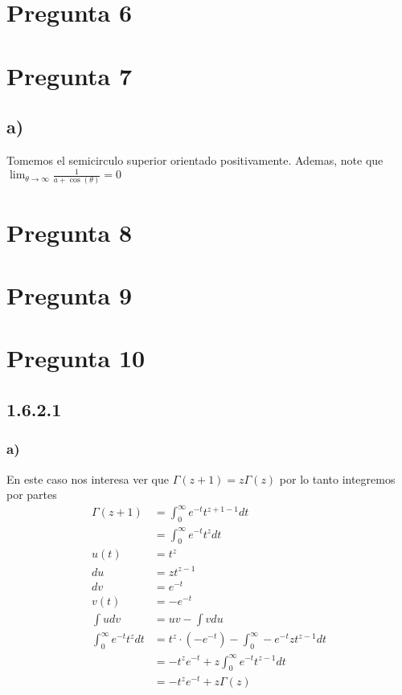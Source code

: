 \documentclass[12pt]{exam}
\begin{document}
\section*{Pregunta 6}

\section*{Pregunta 7}

\subsection*{a)}

Tomemos el semicirculo superior orientado positivamente. Ademas, note que $\displaystyle \lim_{\theta \to \infty} \frac{1}{a + \cos\left( \theta \right) } = 0$

\section*{Pregunta 8}



\section*{Pregunta 9}

\section*{Pregunta 10}
\subsection*{1.6.2.1}
\subsubsection*{a)}

En este caso nos interesa ver que $\Gamma(z + 1) = z\Gamma(z)$ por lo tanto integremos por partes
\begin{align*}
  \Gamma(z + 1) &= \int_{0}^{\infty} e^{-t} t^{z + 1 - 1} dt\\
  &= \int_0^\infty e^{-t} t^{z} dt\\
  u(t) &= t^{z}\\
  du &= zt^{z - 1}\\
  dv &= e^{-t}\\
  v(t) &= -e^{-t}\\
  \int udv &= uv - \int vdu\\
  \int_0^\infty e^{-t} t^{z} dt &= t^{z}\cdot(-e^{-t}) - \int_0^\infty -e^{-t}zt^{z - 1}dt\\
  &= -t^{z}e^{-t} + z\int_0^\infty e^{-t}t^{z-1}dt\\
  &= -t^{z}e^{-t} + z\Gamma(z)
\end{align*}
\end{document}
